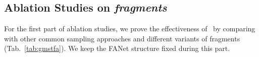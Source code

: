 \documentclass[runningheads]{llncs}
\begin{document}
\begin{comment}
\textbf{FAST-VQA} & \red{0.891(0.030)}\red{} & \red{0.903(0.019)}\red{} & \red{0.721(0.031)} \\ \hline
\hline
\textbf{YouTube-UGC} (1147) & SRCC(std)               & PLCC(std)                 & KRCC(std)   \\ \hline
\textit{best existing:} CoINVQ\cite{rfugc}         & \blue{0.816}          & \blue{0.802}          & NA     \\  \hdashline
Full-res Swin-T\cite{swin3d} \textit{features} &  0.798(0.027) & 0.796(0.021) & 0.603(0.024)  \\ \hline
FAST-VQA & {0.794(0.016)} & {0.784(0.016)} & {0.596(0.017)} \\ \hline
\textbf{FAST-VQA} & \red{0.855(0.008)}\red{} & \red{0.852(0.011)}\red{} & \red{0.667(0.012)} \\ \hline


\end{tabular}
\vspace{-20pt}
\end{table}
\end{comment}



\subsection{Ablation Studies on \textit{fragments}}

For the first part of ablation studies, we prove the effectiveness of \frag~by comparing with other common sampling approaches and different variants of fragments (Tab.~\ref{tab:gmstfa}). We keep the FANet structure fixed during this part.
\end{document}
